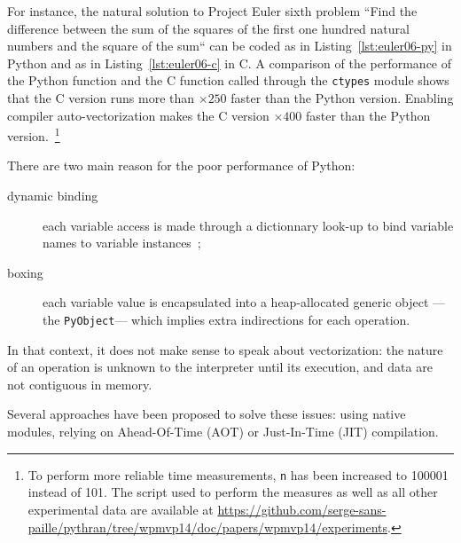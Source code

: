 \documentclass[preprint]{sigplanconf}
\begin{document}
For instance, the natural solution to Project Euler sixth problem ``Find the
difference between the sum of the squares of the first one hundred natural
numbers and the square of the sum`` can be coded as in
Listing~\ref{lst:euler06-py} in Python and as in Listing~\ref{lst:euler06-c} in
C. A comparison of the performance of the Python function and the C function
called through the \texttt{ctypes} module shows that the C version runs more
than $\times250$ faster than the Python version. Enabling compiler
auto-vectorization makes the C version $\times400$ faster than the Python
version.~\footnote{To perform more reliable time measurements, \texttt{n} has
    been increased to 100001 instead of 101. The script used to perform the
    measures as well as all other experimental data are available at
\url{https://github.com/serge-sans-paille/pythran/tree/wpmvp14/doc/papers/wpmvp14/experiments}.}

There are two main reason for the poor performance of Python:

\begin{description}

    \item[dynamic binding] each variable access is made through a dictionnary
        look-up to bind variable names to variable instances~;

    \item[boxing] each variable value is encapsulated into a heap-allocated
        generic object ---the \texttt{PyObject}--- which implies extra
        indirections for each operation.

\end{description}

In that context, it does not make sense to speak about vectorization: the
nature of an operation is unknown to the interpreter until its execution, and
data are not contiguous in memory.





Several approaches have been proposed to solve these issues: using native
modules, relying on Ahead-Of-Time (AOT) or Just-In-Time (JIT) compilation.
\end{document}
